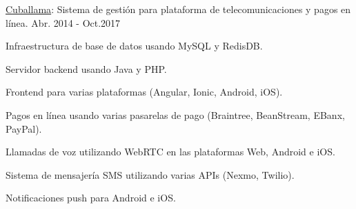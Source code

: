 \begin{cventries}
  \cventry
    {\href{https://www.cuballama.com/}{Cuballama}: Sistema de gestión para plataforma de telecomunicaciones y pagos en línea.} %
    {} %
    {} %
    {Abr. 2014 - Oct.2017} %
    {
      \begin{cvitems} %
        \item {Infraestructura de base de datos usando MySQL y RedisDB.}
        \item {Servidor backend usando Java y PHP.}
        \item {Frontend para varias plataformas (Angular, Ionic, Android, iOS).}
        \item {Pagos en línea usando varias pasarelas de pago (Braintree, BeanStream, EBanx, PayPal).}
        \item {Llamadas de voz utilizando WebRTC en las plataformas Web, Android e iOS.}
        \item {Sistema de mensajería SMS utilizando varias APIs (Nexmo, Twilio).}
        \item {Notificaciones push para Android e iOS.}
      \end{cvitems}
    }

\end{cventries}
